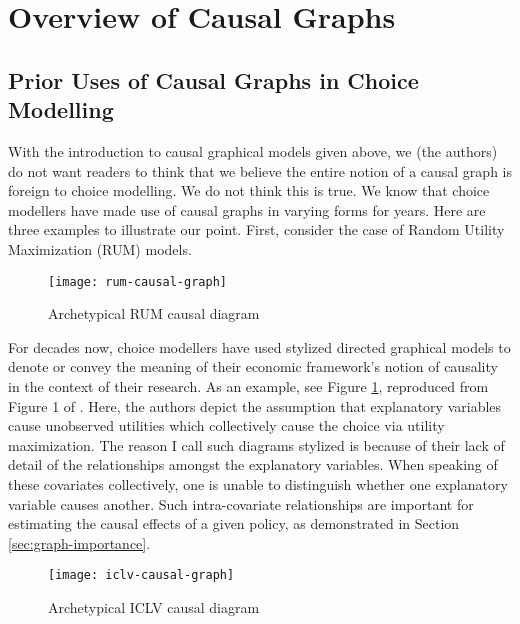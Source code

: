 \section{Overview of Causal Graphs}
\label{sec:graph-overview}

\subsection{Prior Uses of Causal Graphs in Choice Modelling}
\label{sec:choice-graphs}

With the introduction to causal graphical models given above, we (the authors) do not want readers to think that we believe the entire notion of a causal graph is foreign to choice modelling.
We do not think this is true.
We know that choice modellers have made use of causal graphs in varying forms for years.
Here are three examples to illustrate our point.
First, consider the case of Random Utility Maximization (RUM) models.

\begin{figure}
   \centering
   \texttt{[image: rum-causal-graph]}
   \caption{Archetypical RUM causal diagram}
   \label{fig:example-graph-rum}
\end{figure}

For decades now, choice modellers have used stylized directed graphical models to denote or convey the meaning of their economic framework's notion of causality in the context of their research.
As an example, see Figure \ref{fig:example-graph-rum}, reproduced from Figure 1 of \citet{ben_2002_integration}.
Here, the authors depict the assumption that explanatory variables cause unobserved utilities which collectively cause the choice via utility maximization.
The reason I call such diagrams stylized is because of their lack of detail of the relationships amongst the explanatory variables.
When speaking of these covariates collectively, one is unable to distinguish whether one explanatory variable causes another.
Such intra-covariate relationships are important for estimating the causal effects of a given policy, as demonstrated in Section \ref{sec:graph-importance}.

\begin{figure}
   \centering
   \texttt{[image: iclv-causal-graph]}
   \caption{Archetypical ICLV causal diagram}
   \label{fig:example-graph-iclv}
\end{figure}

